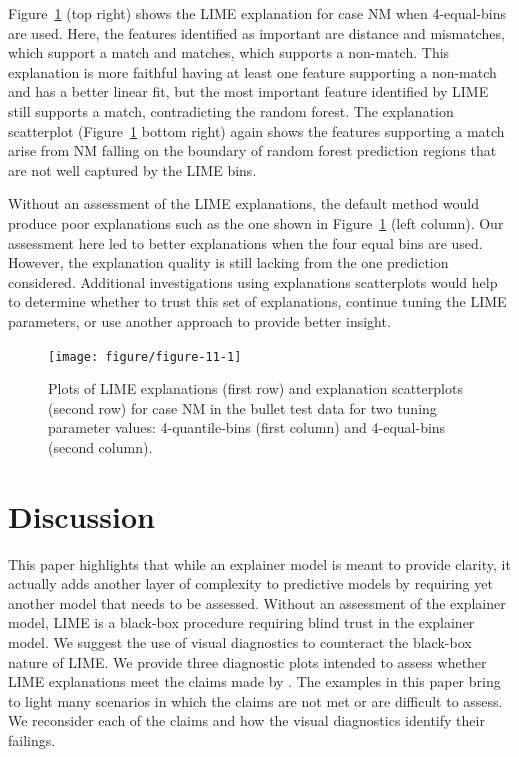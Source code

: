 \documentclass[AMS,STIX2COL]{WileyNJD-v2}\usepackage[]{graphicx}\usepackage[]{color}
\newenvironment{knitrout}{}{} %
\begin{document}
Figure~\ref{fig:figure-11} (top right) shows the LIME explanation for case NM when 4-equal-bins are used. Here, the features identified as important are distance and mismatches, which support a match and matches, which supports a non-match. This explanation is more faithful having at least one feature supporting a non-match and has a better linear fit, but the most important feature identified by LIME still supports a match, contradicting the random forest. The explanation scatterplot (Figure~\ref{fig:figure-11} bottom right) again shows the features supporting a match arise from NM falling on the boundary of random forest prediction regions that are not well captured by the LIME bins.

Without an assessment of the LIME explanations, the default method would produce poor explanations such as the one shown in Figure~\ref{fig:figure-11} (left column). Our assessment here led to better explanations when the four equal bins are used. However, the explanation quality is still lacking from the one prediction considered. Additional investigations using explanations scatterplots would help to determine whether to trust this set of explanations, continue tuning the LIME parameters, or use another approach to provide better insight.





\begin{figure}[!thp]
\begin{knitrout}
\color{fgcolor}

{\centering \texttt{[image: figure/figure-11-1]} 

}



\end{knitrout}
\caption{Plots of LIME explanations (first row) and explanation scatterplots (second row) for case NM in the bullet test data for two tuning parameter values: 4-quantile-bins (first column) and 4-equal-bins (second column). }
\label{fig:figure-11}
\end{figure}



\section{Discussion} \label{discussion}

This paper highlights that while an explainer model is meant to provide clarity, it actually adds another layer of complexity to predictive models by requiring yet another model that needs to be assessed. Without an assessment of the explainer model, LIME is a black-box procedure  requiring blind trust in the explainer model. We suggest the use of visual diagnostics to counteract the black-box nature of LIME. We provide three diagnostic plots  intended to assess whether LIME explanations meet the claims made by \citet{ribeiro:2016}. The examples in this paper bring to light many scenarios in which the claims are not met or are difficult to assess. We reconsider each of the claims and how the visual diagnostics identify their failings.
\end{document}
